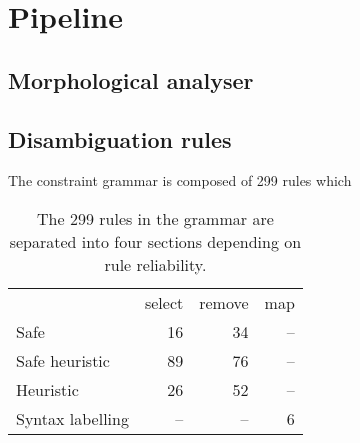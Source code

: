 \documentclass[11pt]{article}
\begin{document}



\section{Pipeline}


\subsection{Morphological analyser}

\cite{yablonsky1999russian}


\subsection{Disambiguation rules}

The constraint grammar is composed of 299 rules which 

\begin{table}
  \centering
  \begin{tabular}{lrrr}
    \hline
                     & {\sc select} & {\sc remove} & {\sc map} \\
    Safe             &   16         &   34         &  -- \\
    Safe heuristic   &   89         &   76         &  -- \\
    Heuristic        &   26         &   52         &  -- \\
    Syntax labelling & --           & --           & 6 \\ 
    \hline
  \end{tabular}
  \caption{The 299 rules in the grammar are separated into four sections depending
      on rule reliability. }
\end{table}

\end{document}

